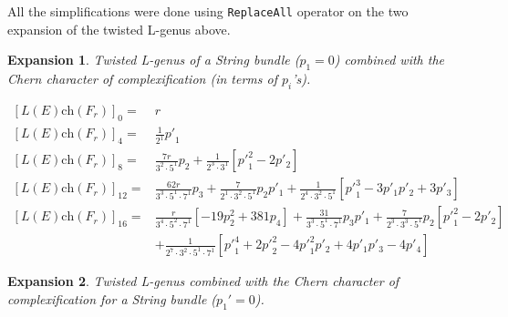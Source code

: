 \documentclass{amsart}
\theoremstyle{plain}
\newcommand{\ch}{\mathrm{ch}}
\numberwithin{equation}{section}
\newtheorem{ex}{Expansion}
\begin{document}
All the simplifications were done using \texttt{ReplaceAll} operator on the two expansion of the twisted L-genus above.

 
\begin{ex}
Twisted L-genus of a String bundle ($p_1=0$) combined with the Chern character of complexification (in terms of $p_i$'s).
\end{ex} 

%
%
%
%
%
%
%
%


\begin{tcolorbox}[text width=16cm, height=4.2cm,
title=Twisted L-genus of String bundle]
{\footnotesize
\begin{align*} 
 {[L(E)\ch(F_r)]}_0 =&r
\\
 {[L(E)\ch(F_r)]}_4 = &\tfrac{1}{2^1}{p'}_1
\\
 {[L(E)\ch(F_r)]}_8 = &
 \tfrac{7r}{3^2\cdot 5^1}  p_2
 +\tfrac{1}{2^3\cdot 3^1}[{p'}_1^2-2 p'_2]
\\
 {[L(E)\ch(F_r)]}_{12}= &
 \tfrac{62r}{3^3\cdot 5^1\cdot 7^1} p_3
+ \tfrac{7}{2^1\cdot 3^2\cdot 5^1}p_2  p'_1
+\tfrac{1}{2^4\cdot 3^2\cdot 5^1}[{p'}_1^3- 3 p'_1 p'_2+3 p'_3]
\\
 {[L(E)\ch(F_r)]}_{16}= &
 \tfrac{r}{3^4\cdot 5^2\cdot 7^1}[-19 p_2^2+381 p_4]
 +\tfrac{31}{3^3\cdot 5^1\cdot 7^1} p_3 p'_1 
+\tfrac{7}{2^3\cdot 3^3\cdot 5^1} p_2 [{p'}_1^2-2 p'_2]
\\
& 
+\tfrac{1}{2^7\cdot 3^2\cdot 5^1\cdot 7^1}[{p'}_1^4+2 {p'}_2^2-
 4 {p'}_1^2  p'_2+ 4 p'_1  p'_3-4 p'_4]
\end{align*}
}
\end{tcolorbox}




\begin{ex}
Twisted L-genus combined with the Chern character of complexification for a String bundle ($p_1'=0$).
\end{ex} 
\end{document}
